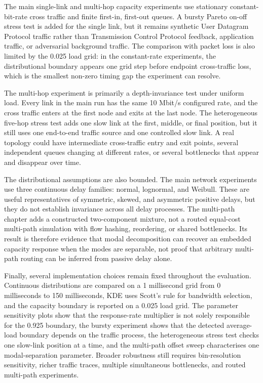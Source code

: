 \documentclass[a4paper,11pt]{report}
\begin{document}
The main single-link and multi-hop capacity experiments use stationary constant-bit-rate cross traffic and finite first-in, first-out queues. A bursty Pareto on-off stress test is added for the single link, but it remains synthetic User Datagram Protocol traffic rather than Transmission Control Protocol feedback, application traffic, or adversarial background traffic. The comparison with packet loss is also limited by the 0.025 load grid: in the constant-rate experiments, the distributional boundary appears one grid step before endpoint cross-traffic loss, which is the smallest non-zero timing gap the experiment can resolve.

The multi-hop experiment is primarily a depth-invariance test under uniform load. Every link in the main run has the same 10 Mbit/s configured rate, and the cross traffic enters at the first node and exits at the last node. The heterogeneous five-hop stress test adds one slow link at the first, middle, or final position, but it still uses one end-to-end traffic source and one controlled slow link. A real topology could have intermediate cross-traffic entry and exit points, several independent queues changing at different rates, or several bottlenecks that appear and disappear over time.

The distributional assumptions are also bounded. The main network experiments use three continuous delay families: normal, lognormal, and Weibull. These are useful representatives of symmetric, skewed, and asymmetric positive delays, but they do not establish invariance across all delay processes. The multi-path chapter adds a constructed two-component mixture, not a routed equal-cost multi-path simulation with flow hashing, reordering, or shared bottlenecks. Its result is therefore evidence that modal decomposition can recover an embedded capacity response when the modes are separable, not proof that arbitrary multi-path routing can be inferred from passive delay alone.

Finally, several implementation choices remain fixed throughout the evaluation. Continuous distributions are compared on a 1 millisecond grid from 0 milliseconds to 150 milliseconds, KDE uses Scott's rule for bandwidth selection, and the capacity boundary is reported on a 0.025 load grid. The parameter sensitivity plots show that the response-rate multiplier is not solely responsible for the 0.925 boundary, the bursty experiment shows that the detected average-load boundary depends on the traffic process, the heterogeneous stress test checks one slow-link position at a time, and the multi-path offset sweep characterises one modal-separation parameter. Broader robustness still requires bin-resolution sensitivity, richer traffic traces, multiple simultaneous bottlenecks, and routed multi-path experiments.
\end{document}
